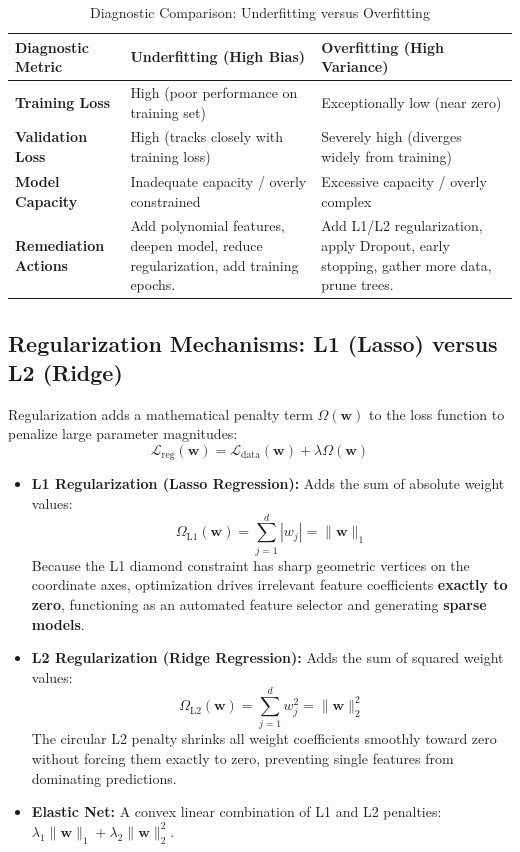 \begin{table}[htbp]
\centering
\small
\caption{Diagnostic Comparison: Underfitting versus Overfitting}
\label{tab:underfitting_overfitting}
\begin{tabularx}{\textwidth}{p{3.2cm}XX}
\toprule
\textbf{Diagnostic Metric} & \textbf{Underfitting (High Bias)} & \textbf{Overfitting (High Variance)} \\
\midrule
\textbf{Training Loss} & High (poor performance on training set) & Exceptionally low (near zero) \\
\textbf{Validation Loss} & High (tracks closely with training loss) & Severely high (diverges widely from training) \\
\textbf{Model Capacity} & Inadequate capacity / overly constrained & Excessive capacity / overly complex \\
\textbf{Remediation Actions} & Add polynomial features, deepen model, reduce regularization, add training epochs. & Add L1/L2 regularization, apply Dropout, early stopping, gather more data, prune trees. \\
\bottomrule
\end{tabularx}
\end{table}

\subsection{Regularization Mechanisms: L1 (Lasso) versus L2 (Ridge)}
Regularization adds a mathematical penalty term $\Omega(\mathbf{w})$ to the loss function to penalize large parameter magnitudes:
\begin{equation}
\label{eq:regularized_loss}
\mathcal{L}_{\text{reg}}(\mathbf{w}) = \mathcal{L}_{\text{data}}(\mathbf{w}) + \lambda \Omega(\mathbf{w})
\end{equation}
\begin{itemize}
    \item \textbf{L1 Regularization (Lasso Regression):} Adds the sum of absolute weight values:
    \begin{equation}
    \Omega_{\text{L1}}(\mathbf{w}) = \sum_{j=1}^d |w_j| = \|\mathbf{w}\|_1
    \end{equation}
    Because the L1 diamond constraint has sharp geometric vertices on the coordinate axes, optimization drives irrelevant feature coefficients \textbf{exactly to zero}, functioning as an automated feature selector and generating \textbf{sparse models}.
    \item \textbf{L2 Regularization (Ridge Regression):} Adds the sum of squared weight values:
    \begin{equation}
    \Omega_{\text{L2}}(\mathbf{w}) = \sum_{j=1}^d w_j^2 = \|\mathbf{w}\|_2^2
    \end{equation}
    The circular L2 penalty shrinks all weight coefficients smoothly toward zero without forcing them exactly to zero, preventing single features from dominating predictions.
    \item \textbf{Elastic Net:} A convex linear combination of L1 and L2 penalties: $\lambda_1 \|\mathbf{w}\|_1 + \lambda_2 \|\mathbf{w}\|_2^2$.
\end{itemize}

